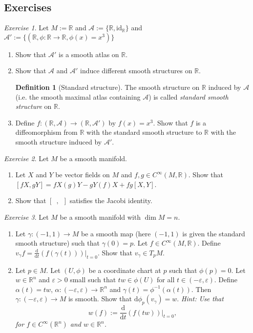 \documentclass[11pt]{amsart}
\numberwithin{equation}{section}
\theoremstyle{plain}
\theoremstyle{definition}
\newtheorem{defn}{Definition}[subsection]
\theoremstyle{remark}
\newtheorem{exe}{Exercise}[subsection]
\newcommand{\R}{\mathbb{R}}
\newcommand{\dd}{{\mathrm{d}}}
\newcommand{\id}{\mathrm{id}}
\newcommand{\calA}{\mathcal{A}}
\begin{document}
\subsection{Exercises}

\begin{exe}
Let $M:=\R$ and $\calA:=\{\R,\id_\R\}$ and $\calA':=\{(\R,\phi\colon\R\to\R,\phi(x)=x^3)\}$ 
\begin{enumerate}
\item{Show that $\calA'$ is a smooth atlas on $\R$.
}
\item{Show that $\calA$ and $\calA'$ induce different smooth structures on $\R$.
}
\begin{defn}[Standard structure]
The smooth structure on $\R$ induced by $\calA$ (i.e. the smooth maximal atlas containing $\calA$) is called \emph{standard smooth structure} on $\R$.
\end{defn}
\item{
Define $f\colon (\R,\calA)\to(\R,\calA')$ by $f(x)=x^3$. Show that $f$ is a diffeomorphism from $\R$ with the standard smooth structure to $\R$ with the smooth structure induced by $\calA'$.

}
\end{enumerate}
\end{exe}


\begin{exe}
Let $M$ be a smooth manifold. 
\begin{enumerate}
\item{Let $X$ and $Y$ be vector fields on $M$ and $f,g\in C^\infty(M,\R)$. Show that $[fX,gY]=fX(g)Y-gY(f)X+fg[X,Y]$.
}
\item{Show that $[\enspace,\enspace]$ satisfies the Jacobi identity.}
\end{enumerate}
\end{exe}

\begin{exe}
Let $M$ be a smooth manifold with $\dim M=n$.
\begin{enumerate}
\item{Let $\gamma\colon (-1,1)\to M$ be a smooth map (here $(-1,1)$ is given the standard smooth structure) such that $\gamma(0)=p$. Let $f\in C^\infty(M,\R)$. Define $v_\gamma f=\frac{\dd}{\dd t}(f(\gamma(t)))\big|_{t=0}$. Show that $v_\gamma\in T_pM$.
}
\item{Let $p\in M$. Let $(U,\phi)$ be a coordinate chart at $p$ such that $\phi(p)=0$. Let $w\in\R^n$ and $\varepsilon>0$ small such that $tw\in\phi(U)$ for all $t\in (-\varepsilon,\varepsilon)$. Define $\alpha(t)=tw$, $\alpha\colon (-\varepsilon,\varepsilon)\to\R^n$ and $\gamma(t)=\phi^{-1}(\alpha(t))$. Then $\gamma\colon(-\varepsilon,\varepsilon)\to M$ is smooth. Show that $\dd\phi_p(v_\gamma)=w$. \emph{Hint: Use that
$$w(f):=\frac{\dd}{\dd t}(f(tw))\big|_{t=0},$$
for $f\in C^\infty(\R^n)$ and $w\in\R^n$.
} 
}
\end{enumerate}
\end{exe}
\end{document}

